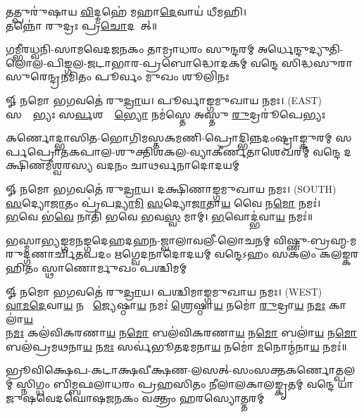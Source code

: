 {\small \closesection}

\begin{center}
𑌤𑌤𑍍𑌪𑍁𑌰𑍁॑𑌷𑌾𑌯 \ul{𑌵𑌿}𑌦𑍍𑌮𑌹𑍇॑ 𑌮𑌹𑌾\ul{𑌦𑍇}𑌵𑌾𑌯॑ 𑌧𑍀𑌮𑌹𑌿।\\
𑌤𑌨𑍍𑌨𑍋॑ 𑌰𑍁𑌦𑍍𑌰𑌃 𑌪𑍍𑌰\ul{𑌚𑍋}𑌦𑌯𑌾᳚𑌤𑍍॥

{𑌗𑌮𑍍𑌭𑍀𑌰𑌧𑍍𑌵𑌨𑌿-𑌸𑌾𑌮𑌵𑍇𑌦𑌜𑌨𑌕𑌂 𑌤𑌾𑌮𑍍𑌰𑌾𑌧𑌰𑌂 𑌸𑍁𑌨𑍍𑌦𑌰𑌮𑍍}
{𑌅𑌰𑍍𑌧𑍇𑌨𑍍𑌦𑍁𑌦𑍍𑌯𑍁𑌤𑌿-𑌲𑍋𑌲-𑌪𑌿𑌙𑍍𑌗𑌲-𑌜𑌟𑌾𑌭𑌾𑌰-𑌪𑍍𑌰𑌬𑍋𑌦𑍍𑌧𑍋𑌦𑌕𑌮𑍍}
{𑌵𑌨𑍍𑌦𑍇 𑌸𑌿𑌦𑍍𑌧𑌸𑍁𑌰𑌾𑌸𑍁𑌰𑍇𑌨𑍍𑌦𑍍𑌰𑌨𑌮𑌿𑌤𑌂 𑌪𑍂𑌰𑍍𑌵𑌂 𑌮𑍁𑌖𑌂 𑌶𑍂𑌲𑌿𑌨𑌃}

𑍐 𑌨𑌮𑍋 𑌭𑌗𑌵𑌤𑍇॑ 𑌰𑍁\ul{𑌦𑍍𑌰𑌾}𑌯। 𑌪𑍂𑌰𑍍𑌵𑌾𑌙𑍍𑌗𑌮𑍁𑌖𑌾𑌯 𑌨𑌮𑌃। {\scriptsize (EAST)}\\[1em]

{𑌸𑌰𑍍𑌵𑍇᳚𑌭𑍍𑌯𑌃 𑌸\ul{𑌰𑍍𑌵}𑌶𑌰𑍍𑌵𑍇᳚\ul{𑌭𑍍𑌯𑍋} 𑌨𑌮॑𑌸𑍍𑌤𑍇 𑌅𑌸𑍍𑌤𑍁 \ul{𑌰𑍁}𑌦𑍍𑌰𑌰𑍂॑𑌪𑍇𑌭𑍍𑌯𑌃}

{𑌕𑌰𑍍𑌣𑍋𑌦𑍍𑌭𑌾𑌸𑌿𑌤-𑌭𑍋𑌗𑌿𑌮𑌸𑍍𑌤𑌕𑌮𑌣𑌿-𑌪𑍍𑌰𑍋𑌦𑍍𑌭𑌿𑌨𑍍𑌨𑌦𑌂𑌷𑍍𑌟𑍍𑌰𑌾𑌙𑍍𑌕𑍁𑌰𑌮𑍍}
{𑌸𑌰𑍍𑌪𑌪𑍍𑌰𑍋𑌤𑌕𑌪𑌾𑌲-𑌶𑍁𑌕𑍍𑌤𑌿𑌶𑌕𑌲-𑌵𑍍𑌯𑌾𑌕𑍀𑌰𑍍𑌣𑌤𑌾𑌶𑍇𑌖𑌰𑌮𑍍}
{𑌵𑌨𑍍𑌦𑍇 𑌦𑌕𑍍𑌷𑌿𑌣𑌮𑍀𑌶𑍍𑌵𑌰𑌸𑍍𑌯 𑌵𑌦𑌨𑌂 𑌚𑌾𑌥𑌰𑍍𑌵𑌨𑌾𑌦𑍋𑌦𑌯𑌮𑍍}

𑍐 𑌨𑌮𑍋 𑌭𑌗𑌵𑌤𑍇॑ 𑌰𑍁\ul{𑌦𑍍𑌰𑌾}𑌯। 𑌦𑌕𑍍𑌷𑌿𑌣𑌾𑌙𑍍𑌗𑌮𑍁𑌖𑌾𑌯 𑌨𑌮𑌃। {\scriptsize (SOUTH)}\\[1em]

\ul{𑌸}𑌦𑍍𑌯𑍋\ul{𑌜𑌾}𑌤𑌂 𑌪𑍍𑌰॑𑌪\ul{𑌦𑍍𑌯𑌾}\ul{𑌮𑌿} \ul{𑌸}𑌦𑍍𑌯𑍋\ul{𑌜𑌾}𑌤𑌾\ul{𑌯} 𑌵𑍈 𑌨\ul{𑌮𑍋} 𑌨𑌮𑌃॑।\\
\ul{𑌭}𑌵𑍇 𑌭॑\ul{𑌵𑍇} 𑌨𑌾𑌤𑌿॑ 𑌭𑌵𑍇 𑌭𑌵\ul{𑌸𑍍𑌵} 𑌮𑌾𑌮𑍍। \ul{𑌭}𑌵𑍋𑌦𑍍𑌭॑𑌵𑌾\ul{𑌯} 𑌨𑌮𑌃॑॥ 

{𑌭𑌸𑍍𑌮𑌾𑌭𑍍𑌯𑌙𑍍𑌗𑌮𑌨𑌙𑍍𑌗𑌦𑍇𑌹𑌦𑌹𑌨-𑌜𑍍𑌵𑌾𑌲𑌾𑌵𑌲𑍀-𑌲𑍋𑌚𑌨𑌮𑍍}
{𑌵𑌿𑌷𑍍𑌣𑍁-𑌬𑍍𑌰𑌹𑍍𑌮-𑌮𑌰𑍁𑌦𑍍𑌗𑌣𑌾𑌰𑍍𑌚𑌿𑌤𑌪𑌦𑌂 𑌋𑌗𑍍𑌵𑍇𑌦𑌨𑌾𑌦𑍋𑌦𑌯𑌮𑍍}
{𑌵𑌨𑍍𑌦𑍇𑌽𑌹𑌂 𑌸𑌕𑌲𑌂 𑌕𑌲𑌙𑍍𑌕𑌰𑌹𑌿𑌤𑌂 𑌸𑍍𑌥𑌾𑌣𑍋𑌰𑍍𑌮𑍁𑌖𑌂 𑌪𑌶𑍍𑌚𑌿𑌮𑌮𑍍}

𑍐 𑌨𑌮𑍋 𑌭𑌗𑌵𑌤𑍇॑ 𑌰𑍁\ul{𑌦𑍍𑌰𑌾}𑌯। 𑌪𑌶𑍍𑌚𑌿𑌮𑌾𑌙𑍍𑌗𑌮𑍁𑌖𑌾𑌯 𑌨𑌮𑌃। {\scriptsize (WEST)}\\[1em]

\ul{𑌵𑌾}\ul{𑌮}\ul{𑌦𑍇}𑌵𑌾\ul{𑌯} 𑌨𑌮𑍋᳚ \ul{𑌜𑍍𑌯𑍇}𑌷𑍍𑌠𑌾\ul{𑌯} 𑌨𑌮𑌃॑ \ul{𑌶𑍍𑌰𑍇}𑌷𑍍𑌠𑌾\ul{𑌯} 𑌨𑌮𑍋॑ \ul{𑌰𑍁}𑌦𑍍𑌰𑌾\ul{𑌯} 𑌨\ul{𑌮𑌃} 𑌕𑌾𑌲𑌾॑\ul{𑌯}\\ 𑌨\ul{𑌮𑌃} 𑌕𑌲॑𑌵𑌿𑌕𑌰𑌣𑌾\ul{𑌯} 𑌨\ul{𑌮𑍋} 𑌬𑌲॑𑌵𑌿𑌕𑌰𑌣𑌾\ul{𑌯} 𑌨\ul{𑌮𑍋} 𑌬𑌲𑌾॑\ul{𑌯} 𑌨\ul{𑌮𑍋} 𑌬𑌲॑𑌪𑍍𑌰𑌮𑌥𑌨𑌾\ul{𑌯} 𑌨\ul{𑌮𑌃} 𑌸𑌰𑍍𑌵॑𑌭𑍂𑌤𑌦𑌮𑌨𑌾\ul{𑌯} 𑌨𑌮𑍋॑ \ul{𑌮}𑌨𑍋𑌨𑍍𑌮॑𑌨𑌾\ul{𑌯} 𑌨𑌮𑌃॑॥

{𑌭𑍍𑌰𑍂𑌵𑌿𑌕𑍍𑌷𑍇𑌪-𑌕𑌟𑌾𑌕𑍍𑌷𑌵𑍀𑌕𑍍𑌷𑌣-𑌲𑌸𑌤𑍍-𑌸𑌂𑌸𑌕𑍍𑌤𑌕𑌰𑍍𑌣𑍋𑌤𑍍𑌪𑌲𑌮𑍍}
{𑌸𑍍𑌨𑌿𑌗𑍍𑌧𑌂 𑌬𑌿𑌮𑍍𑌬𑌫𑌲𑌾𑌧𑌰𑌂 𑌪𑍍𑌰𑌹𑌸𑌿𑌤𑌂 𑌨𑍀𑌲𑌾𑌲𑌕𑌾𑌲𑌙𑍍𑌕𑍃𑌤𑌮𑍍}
{𑌵𑌨𑍍𑌦𑍇 𑌯𑌾𑌜𑍁𑌷𑌵𑍇𑌦𑌘𑍋𑌷𑌜𑌨𑌕𑌂 𑌵𑌕𑍍𑌤𑍍𑌰𑌂 𑌹𑌰𑌸𑍍𑌯𑍋𑌤𑍍𑌤𑌰𑌮𑍍}


\end{center}
